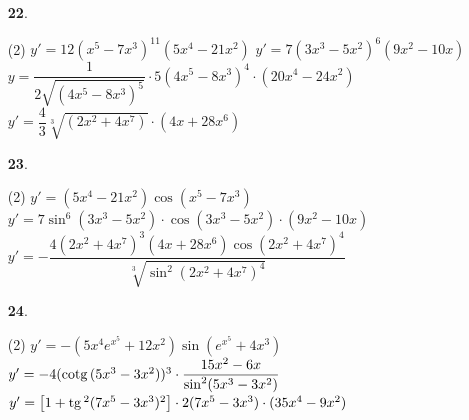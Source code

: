 \documentclass[a4paper, pdf, twoside]{book}
\begin{document}
\begin{enumerate}

 \item[\fontfamily{phv}\selectfont\color{blue}\textbf{22}. ] 
 \begin{tasks}[column-sep=1em, item-indent=1.3333em](2)
	 \task* $y' = 12(x^5 - 7x^3)^{11} (5x^4-21x^2)$
	 \task* $y' = 7(3x^3 - 5x^2)^6 (9x^2-10x)$
	 \task* $y=\dfrac {1}{2\sqrt {\left (4x^{5} -8x^{3} \right )^{5} }} \cdot 5 \left (4x^{5} -8x^{3} \right )^{4} \cdot (20 x^4 - 24x^2) $
	 \task* $y'=\dfrac {4}{3}\sqrt [{3}]{\left ( 2x^{2} +4x^{7} \right ) } \cdot (4x+28x^6) $
\end{tasks}
\vspace{0.25cm}



 \item[\fontfamily{phv}\selectfont\color{blue}\textbf{23}. ] 
 \begin{tasks}[column-sep=1em, item-indent=1.3333em](2)
	 \task* $y' = (5x^4-21 x^2) \cos (x^5 - 7x^3)$
	 \task* $y' = 7 \sin ^6(3x^3 - 5x^2) \cdot \cos (3x^3 - 5x^2) \cdot (9x^2-10x)$
	 \task* $y'=-\dfrac {4(2x^{2} +4x^{7})^3 (4x+28x^6) \cos \left (2x^{2} +4x^{7} \right )^{4} }{\sqrt [{3}]{\sin ^2 \left (2x^{2} +4x^{7} \right )^{4} } }$ 
\end{tasks}
\vspace{0.25cm}



 \item[\fontfamily{phv}\selectfont\color{blue}\textbf{24}. ] 
 \begin{tasks}[column-sep=1em, item-indent=1.3333em](2)
	 \task*  $y' = -(5x^4 e^{x^5}+12x^2) \sin (e^{x^5} + 4x^3)$
	 \task* $y' = -4(\mathrm{cotg}\, (5x^3 - 3x^2))^3 \cdot \dfrac {15x^2-6x}{\sin ^2(5x^3 - 3x^2)}$
	 \task* $y' = \left [ 1+\mathrm{tg}\, ^2(7x^5 - 3x^3)^2 \right ] \cdot 2 (7x^5-3x^3)\cdot (35x^4-9x^2)$ 
\end{tasks}
 \end{enumerate}
\vspace{0.3cm}

\end{document}
